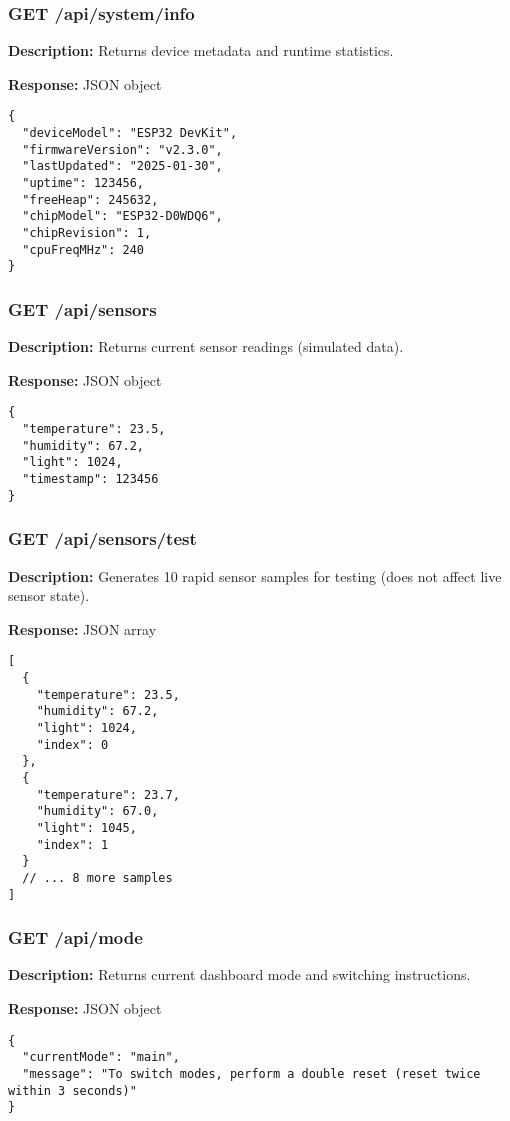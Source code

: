 \documentclass[11pt,a4paper]{article}
\begin{document}
\subsubsection{GET /api/system/info}
\textbf{Description:} Returns device metadata and runtime statistics.

\textbf{Response:} JSON object
\begin{verbatim}
{
  "deviceModel": "ESP32 DevKit",
  "firmwareVersion": "v2.3.0",
  "lastUpdated": "2025-01-30",
  "uptime": 123456,
  "freeHeap": 245632,
  "chipModel": "ESP32-D0WDQ6",
  "chipRevision": 1,
  "cpuFreqMHz": 240
}
\end{verbatim}

\subsubsection{GET /api/sensors}
\textbf{Description:} Returns current sensor readings (simulated data).

\textbf{Response:} JSON object
\begin{verbatim}
{
  "temperature": 23.5,
  "humidity": 67.2,
  "light": 1024,
  "timestamp": 123456
}
\end{verbatim}

\subsubsection{GET /api/sensors/test}
\textbf{Description:} Generates 10 rapid sensor samples for testing (does not affect live sensor state).

\textbf{Response:} JSON array
\begin{verbatim}
[
  {
    "temperature": 23.5,
    "humidity": 67.2,
    "light": 1024,
    "index": 0
  },
  {
    "temperature": 23.7,
    "humidity": 67.0,
    "light": 1045,
    "index": 1
  }
  // ... 8 more samples
]
\end{verbatim}

\subsubsection{GET /api/mode}
\textbf{Description:} Returns current dashboard mode and switching instructions.

\textbf{Response:} JSON object
\begin{verbatim}
{
  "currentMode": "main",
  "message": "To switch modes, perform a double reset (reset twice within 3 seconds)"
}
\end{verbatim}
\end{document}
